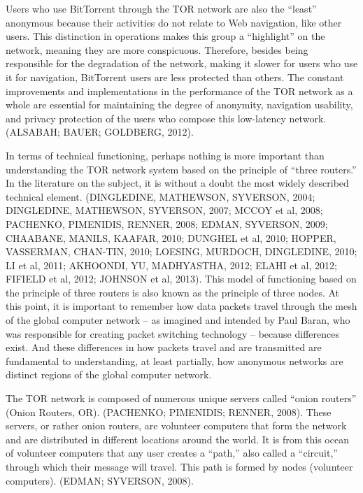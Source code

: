Users who use BitTorrent through the TOR network are also the ``least'' anonymous because their activities do not relate to Web navigation, like other users. This distinction in operations makes this group a ``highlight'' on the network, meaning they are more conspicuous. Therefore, besides being responsible for the degradation of the network, making it slower for users who use it for navigation, BitTorrent users are less protected than others. The constant improvements and implementations in the performance of the TOR network as a whole are essential for maintaining the degree of anonymity, navigation usability, and privacy protection of the users who compose this low-latency network. (ALSABAH; BAUER; GOLDBERG, 2012).

In terms of technical functioning, perhaps nothing is more important than understanding the TOR network system based on the principle of ``three routers.'' In the literature on the subject, it is without a doubt the most widely described technical element. (DINGLEDINE, MATHEWSON, SYVERSON, 2004; DINGLEDINE, MATHEWSON, SYVERSON, 2007; MCCOY et al, 2008; PACHENKO, PIMENIDIS, RENNER, 2008; EDMAN, SYVERSON, 2009; CHAABANE, MANILS, KAAFAR, 2010; DUNGHEL et al, 2010; HOPPER, VASSERMAN, CHAN-TIN, 2010; LOESING, MURDOCH, DINGLEDINE, 2010; LI et al, 2011; AKHOONDI, YU, MADHYASTHA, 2012; ELAHI et al, 2012; FIFIELD et al, 2012; JOHNSON et al, 2013). This model of functioning based on the principle of three routers is also known as the principle of three nodes. At this point, it is important to remember how data packets travel through the mesh of the global computer network -- as imagined and intended by Paul Baran, who was responsible for creating packet switching technology -- because differences exist. And these differences in how packets travel and are transmitted are fundamental to understanding, at least partially, how anonymous networks are distinct regions of the global computer network.

The TOR network is composed of numerous unique servers called ``onion routers'' (Onion Routers, OR). (PACHENKO; PIMENIDIS; RENNER, 2008). These servers, or rather onion routers, are volunteer computers that form the network and are distributed in different locations around the world. It is from this ocean of volunteer computers that any user creates a ``path,'' also called a ``circuit,'' through which their message will travel. This path is formed by nodes (volunteer computers). (EDMAN; SYVERSON, 2008).

